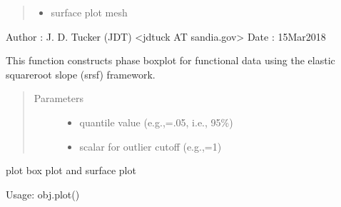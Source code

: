 \documentclass[letterpaper,10pt,english]{sphinxmanual}
\begin{document}
\begin{fulllineitems}
\begin{quote}
\begin{description}
\begin{itemize}
\item {} 
 \textendash{} surface plot mesh

\end{itemize}

\end{description}\end{quote}

Author :  J. D. Tucker (JDT) \textless{}jdtuck AT sandia.gov\textgreater{}
Date   :  15\sphinxhyphen{}Mar\sphinxhyphen{}2018

\begin{fulllineitems}
\label{\detokenize{boxplots:boxplots.phbox.construct_boxplot}}
This function constructs phase boxplot for functional data using the elastic
square\sphinxhyphen{}root slope (srsf) framework.
\begin{quote}\begin{description}
\item[{Parameters}] \leavevmode\begin{itemize}
\item {} 
 \textendash{} quantile value (e.g.,=.05, i.e., 95\%)

\item {} 
 \textendash{} scalar for outlier cutoff (e.g.,=1)

\end{itemize}

\end{description}\end{quote}

\end{fulllineitems}


\begin{fulllineitems}
\label{\detokenize{boxplots:boxplots.phbox.plot}}
plot box plot and surface plot

Usage: obj.plot()

\end{fulllineitems}


\end{fulllineitems}
\end{document}
